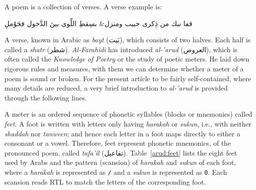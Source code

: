 A poem is a collection of verses. A verse example is:%
\begin{Arabic}
  \begin{traditionalpoem*}
    قفا نبك من ذِكرى حبيب ومنزل\quad & \quad بسِقطِ اللِّوى بينَ الدَّخول فحَوْملِ
  \end{traditionalpoem*}
\end{Arabic}
A verse, known in Arabic as \textit{bayt} \textarabic{(بَيت)}, which consists of two halves. Each
half is called a \textit{shatr} (\textarabic{شطر}).  \textit{Al-Farahidi} has introduced
\textit{al-'arud} (\textarabic{العروض}), which is often called the \textit{Knowledge of Poetry} or
the study of poetic meters. He laid down rigorous rules and measures, with them we can determine
whether a meter of a poem is sound or broken. For the present article to be fairly self-contained,
where many details are reduced, a very brief introduction to \textit{al-'arud} is provided through
the following lines.
\begin{table}[!tb]
  \centering
  \caption{The eight feet of Arabic poetry. Every digit (\texttt{/} or \texttt{0}) represents the
    corresponding diacritic over a letter of a feet: \textit{harakah} (\mbox{\textarabic{◌َ}
      \textarabic{◌ُ} \textarabic{◌ِ}}) or \textit{sukun} (\textarabic{◌ْ}) respectively. Any of the
    three letters \mbox{\textarabic{و ا ى}} (called \textit{mad}) is equivalent to \texttt{0};
    \textit{tanween} and \textit{shaddah} are equivalent to \texttt{0/} and \texttt{/0}
    respectively.}\label{arud:feet}
\end{table}

A meter is an ordered sequence of phonetic syllables (blocks or mnemonics) called \textit{feet}. A
foot is written with letters only having \textit{harakah} or \textit{sukun}, i.e., with neither
\textit{shaddah} nor \textit{tanween}; and hence each letter in a foot maps directly to either a
consonant or a vowel. Therefore, feet represent phonetic mnemonics, of the pronounced
poem, called \textit{tafa'il} (\textarabic{تفاعيل}). Table~\ref{arud:feet} lists the eight feet used
by Arabs and the pattern (scansion) of \textit{harakah} and \textit{sukun} of each foot, where a
\textit{harakah} is represented as \texttt{/} and a \textit{sukun} is represented as
\texttt{0}. Each scansion reads RTL to match the letters of the corresponding foot.

